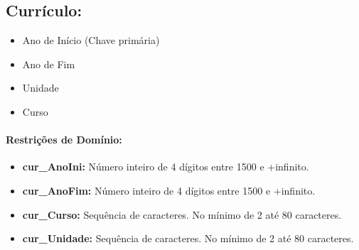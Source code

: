 \documentclass{report}
\begin{document}
%			
%
%
\subsection{Currículo:}
\begin{itemize}
  \item Ano de Início (Chave primária)
   \item Ano de Fim
   \item Unidade
   \item Curso
\end{itemize}
\paragraph{Restrições de Domínio:}
\begin{itemize}
  \item \textbf{cur\_AnoIni:} Número inteiro de 4 dígitos entre 1500 e +infinito.
   \item \textbf{cur\_AnoFim:} Número inteiro de 4 dígitos entre 1500 e +infinito.
   \item \textbf{cur\_Curso:} Sequência de caracteres. No mínimo de 2 até 80 caracteres.
   \item \textbf{cur\_Unidade:} Sequência de caracteres. No mínimo de 2 até 80 caracteres.
\end{itemize}
\iffalse
\end{document}
